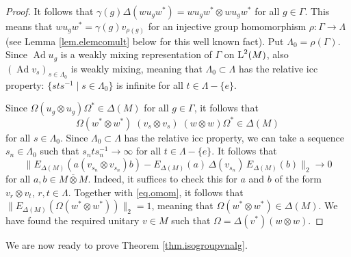 \documentclass[a4paper,11pt]{amsart}
\numberwithin{equation}{section}
\begin{document}
\begin{proof}
It follows that $\gamma(g) {\Delta}(w u_g w^*) = w u_g w^* {\otimes} w u_g w^*$ for all $g \in \Gamma$. This means that $w u_g w^* = \gamma(g) v_{\rho(g)}$ for an injective group homomorphism $\rho : \Gamma {\rightarrow} \Lambda$ (see Lemma \ref{lem.elemcomult} below for this well known fact). Put $\Lambda_0 = \rho(\Gamma)$. Since ${\operatorname{Ad}} u_g$ is a weakly mixing representation of $\Gamma$ on ${\mathord{\text{\rm L}}}^2(M)$, also $({\operatorname{Ad}} v_s)_{s \in \Lambda_0}$ is weakly mixing, meaning that $\Lambda_0 \subset \Lambda$ has the relative icc property: $\{s t s^{-1} \mid s \in \Lambda_0 \}$ is infinite for all $t \in \Lambda - \{e\}$.

Since ${\Omega} (u_g {\otimes} u_g) {\Omega}^* \in {\Delta}(M)$ for all $g \in \Gamma$, it follows that
\begin{equation}\label{eq.omom}
{\Omega} (w^* {\otimes} w^*) \; (v_s {\otimes} v_s) \; (w {\otimes} w){\Omega}^* \in {\Delta}(M)
\end{equation}
for all $s \in \Lambda_0$. Since $\Lambda_0 \subset \Lambda$ has the relative icc property, we can take a sequence $s_n \in \Lambda_0$ such that $s_n t s_n^{-1} {\rightarrow} \infty$ for all $t \in \Lambda - \{e\}$. It follows that
$$\|E_{{\Delta}(M)}(a (v_{s_n} {\otimes} v_{s_n}) b) - E_{{\Delta}(M)}(a) \, {\Delta}(v_{s_n}) \, E_{{\Delta}(M)}(b) \|_2 {\rightarrow} 0$$
for all $a,b \in M {\mathbin{\overline{\otimes}}} M$. Indeed, it suffices to check this for $a$ and $b$ of the form $v_r {\otimes} v_t$, $r,t \in \Lambda$. Together with \eqref{eq.omom}, it follows that $\|E_{{\Delta}(M)}({\Omega} (w^* {\otimes} w^*))\|_2 = 1$, meaning that ${\Omega}(w^* {\otimes} w^*) \in {\Delta}(M)$. We have found the required unitary $v \in M$ such that ${\Omega} = {\Delta}(v^*)(w {\otimes} w)$.
\end{proof}

We are now ready to prove Theorem \ref{thm.isogroupvnalg}.
\end{document}
